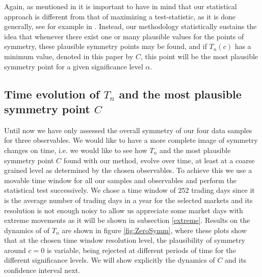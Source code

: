 \documentclass{elsarticle}
\begin{document}
Again, as mentioned in \cite{Coronel-Montoya} it is important to have in mind that our statistical approach is different from that of maximizing a test-statistic, as it is done generally, see for example in \cite{Karsten,Coronel_tesis,Coronel}. Instead, our methodology statistically sustains the idea that whenever there exist one or many plausible values for the points of symmetry, these plausible symmetry points may be found, and if $T_n(c)$ has a minimum value, denoted in this paper by  $C$, this point will be the most plausible symmetry point for a given significance level $\alpha$.

\subsection{Time evolution of $T_n$ and the most plausible symmetry point $C$}
 Until now we have only assessed the overall  symmetry  of our four data samples for three observables. We would like to have a more complete image of symmetry changes on time, i.e. we would like  to see how $T_n$ and the  most plausible symmetry point $C$ found with our method,  evolve over time, at least at a coarse grained level as determined by the chosen observables. To achieve this we use a movable time window for all our samples and observables and perform the statistical test successively. We chose a time window of $252$ trading days since it is the average number of trading days in a year for the selected markets and its resolution is not enough noisy to allow us  appreciate some market days with extreme movements as it will be shown in subsection \ref{extreme}.  Results on the dynamics of of $T_n$ are shown in figure \ref{fig:ZeroSymm}, where these plots show that at the chosen time window  resolution level,  the plausibility of symmetry around $c=0$ is variable, being rejected at different periods of time for the different significance levels. We will show explicitly the dynamics of $C$ and its confidence interval next.
\end{document}
